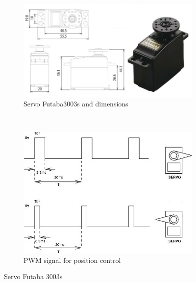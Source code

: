 \begin{figure}[h]
		\centering
        \begin{subfigure}[b]{0.54\textwidth}
                \centering
                \includegraphics[width=\textwidth]{images/Hardware_futaba3003s_dimensions.jpg}
                \caption{Servo Futaba3003s and dimensions}
                \label{fig:hardware_futaba3003s_dimensions}
        \end{subfigure}
        ~
        \begin{subfigure}[b]{0.43\textwidth}
                \centering
                \includegraphics[width=\textwidth]{images/Hardware_futaba3003s_pwm.jpg}
                \caption{PWM signal for position control}
                \label{fig:hardware_futaba3003s_pwm}
        \end{subfigure}
        \caption{Servo Futaba 3003s} 
        \label{fig:hardware_futaba3003s}
\end{figure}


